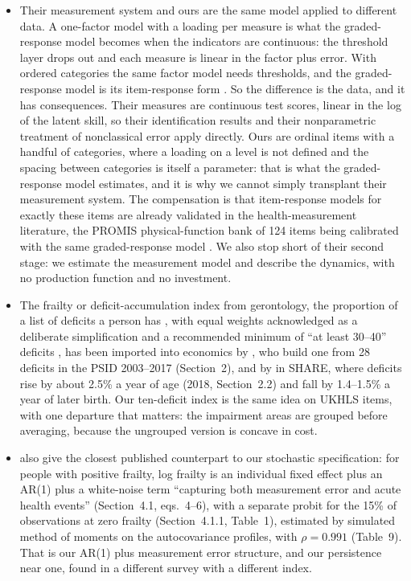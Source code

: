 \documentclass[11pt]{article}
\begin{document}
\begin{itemize}
\item Their measurement system and ours are the same model applied to different data. A one-factor model with a loading per measure is what the graded-response model becomes when the indicators are continuous: the threshold layer drops out and each measure is linear in the factor plus error. With ordered categories the same factor model needs thresholds, and the graded-response model is its item-response form \citep{takane1987}. So the difference is the data, and it has consequences. Their measures are continuous test scores, linear in the log of the latent skill, so their identification results and their nonparametric treatment of nonclassical error apply directly. Ours are ordinal items with a handful of categories, where a loading on a level is not defined and the spacing between categories is itself a parameter: that is what the graded-response model estimates, and it is why we cannot simply transplant their measurement system. The compensation is that item-response models for exactly these items are already validated in the health-measurement literature, the PROMIS physical-function bank of 124 items being calibrated with the same graded-response model \citep{cella2010}. We also stop short of their second stage: we estimate the measurement model and describe the dynamics, with no production function and no investment.
\item The frailty or deficit-accumulation index from gerontology, the proportion of a list of deficits a person has \citep[92 items in the original;][]{mitnitski2001}, with equal weights acknowledged as a deliberate simplification \citep{mitnitski2002} and a recommended minimum of ``at least 30--40'' deficits \citep[Discussion]{searle2008}, has been imported into economics by \citet{hosseini2022}, who build one from 28 deficits in the PSID 2003--2017 (Section~2), and by \citet{abeliansky2018,abeliansky2019} in SHARE, where deficits rise by about 2.5\% a year of age (2018, Section~2.2) and fall by 1.4--1.5\% a year of later birth. Our ten-deficit index is the same idea on UKHLS items, with one departure that matters: the impairment areas are grouped before averaging, because the ungrouped version is concave in cost.
\item \citet{hosseini2022} also give the closest published counterpart to our stochastic specification: for people with positive frailty, log frailty is an individual fixed effect plus an AR(1) plus a white-noise term ``capturing both measurement error and acute health events'' (Section~4.1, eqs.~4--6), with a separate probit for the 15\% of observations at zero frailty (Section~4.1.1, Table~1), estimated by simulated method of moments on the autocovariance profiles, with $\rho=0.991$ (Table~9). That is our AR(1) plus measurement error structure, and our persistence near one, found in a different survey with a different index.
\end{itemize}
\end{document}
